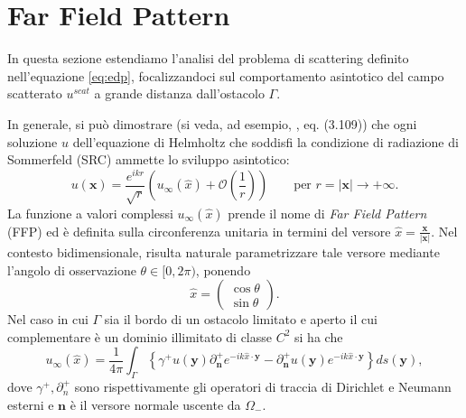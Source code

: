 \documentclass[a4paper,12pt]{article}
\theoremstyle{definition}
\begin{document}
\newpage
\section{Far Field Pattern}
In questa sezione estendiamo l'analisi del problema di scattering definito nell'equazione \ref{eq:edp}, focalizzandoci sul comportamento asintotico del campo scatterato $u^{scat}$ a grande distanza dall'ostacolo $\Gamma$. 

In generale, si può dimostrare (si veda, ad esempio, \cite{CK19}, eq. (3.109)) che ogni soluzione $u$ dell'equazione di Helmholtz che soddisfi la condizione di radiazione di Sommerfeld (SRC) ammette lo sviluppo asintotico:
\begin{equation}
	\label{eq:relazione u_scat e ffp}
	u(\textbf{x}) = \frac{e^{ikr}}{\sqrt{r}} \left( u_\infty (\hat{x}	) + \mathcal{O}\left(\frac{1}{r}\right) \right) \qquad \text{per } r = |\textbf{x}| \rightarrow +\infty.
\end{equation}
La funzione a valori complessi $u_\infty(\hat{x})$ prende il nome di \textit{Far Field Pattern} (FFP) ed è definita sulla circonferenza unitaria in termini del versore $\hat{x} = \frac{\textbf{x}}{|\textbf{x}|}$. Nel contesto bidimensionale, risulta naturale parametrizzare tale versore mediante l'angolo di osservazione $\theta \in [0, 2\pi)$, ponendo
\begin{equation*}
	\hat{x} = \begin{pmatrix} \cos\theta \\ \sin\theta \end{pmatrix}.
\end{equation*}
Nel caso in cui $\Gamma$ sia il bordo di un ostacolo limitato e aperto il cui complementare è un dominio illimitato di classe $C^2$ si ha che 
\begin{equation}
	\label{eq:ffp generale}
	u_\infty (\hat{x}) = \frac{1}{4\pi} \int_\Gamma \left\{\gamma^+u(\textbf{y})\partial_\textbf{n}^+ e^{-ik\hat{x} \cdot \textbf{y}} - \partial_\textbf{n}^+ u(\textbf{y}) e^{-ik\hat{x} \cdot \textbf{y}} \right\} ds(\textbf{y}),
\end{equation}
dove $\gamma^+, \partial_n^+$ sono rispettivamente gli operatori di traccia di Dirichlet e Neumann esterni  e $\textbf{n}$ è il versore normale uscente da $\Omega_-$.
\end{document}

